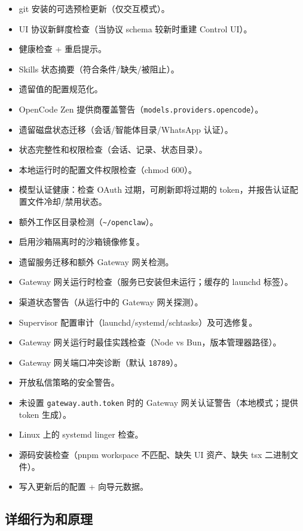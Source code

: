 \begin{itemize}
  \item git 安装的可选预检更新（仅交互模式）。
  \item UI 协议新鲜度检查（当协议 schema 较新时重建 Control UI）。
  \item 健康检查 + 重启提示。
  \item Skills 状态摘要（符合条件/缺失/被阻止）。
  \item 遗留值的配置规范化。
  \item OpenCode Zen 提供商覆盖警告（\texttt{models.providers.opencode}）。
  \item 遗留磁盘状态迁移（会话/智能体目录/WhatsApp 认证）。
  \item 状态完整性和权限检查（会话、记录、状态目录）。
  \item 本地运行时的配置文件权限检查（chmod 600）。
  \item 模型认证健康：检查 OAuth 过期，可刷新即将过期的 token，并报告认证配置文件冷却/禁用状态。
  \item 额外工作区目录检测（\texttt{\textasciitilde{}/openclaw}）。
  \item 启用沙箱隔离时的沙箱镜像修复。
  \item 遗留服务迁移和额外 Gateway 网关检测。
  \item Gateway 网关运行时检查（服务已安装但未运行；缓存的 launchd 标签）。
  \item 渠道状态警告（从运行中的 Gateway 网关探测）。
  \item Supervisor 配置审计（launchd/systemd/schtasks）及可选修复。
  \item Gateway 网关运行时最佳实践检查（Node vs Bun，版本管理器路径）。
  \item Gateway 网关端口冲突诊断（默认 \texttt{18789}）。
  \item 开放私信策略的安全警告。
  \item 未设置 \texttt{gateway.auth.token} 时的 Gateway 网关认证警告（本地模式；提供 token 生成）。
  \item Linux 上的 systemd linger 检查。
  \item 源码安装检查（pnpm workspace 不匹配、缺失 UI 资产、缺失 tsx 二进制文件）。
  \item 写入更新后的配置 + 向导元数据。
\end{itemize}


\subsection{详细行为和原理}


